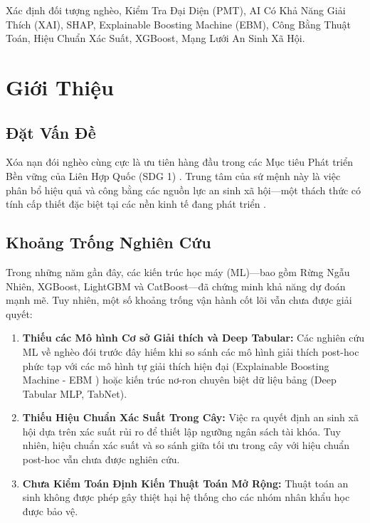 \documentclass[conference]{IEEEtran}
\begin{document}
\begin{IEEEkeywords}
Xác định đối tượng nghèo, Kiểm Tra Đại Diện (PMT), AI Có Khả Năng Giải Thích (XAI), SHAP, Explainable Boosting Machine (EBM), Công Bằng Thuật Toán, Hiệu Chuẩn Xác Suất, XGBoost, Mạng Lưới An Sinh Xã Hội.
\end{IEEEkeywords}

\section{Giới Thiệu}

\subsection{Đặt Vấn Đề}
Xóa nạn đói nghèo cùng cực là ưu tiên hàng đầu trong các Mục tiêu Phát triển Bền vững của Liên Hợp Quốc (SDG 1) \cite{b1}. Trung tâm của sứ mệnh này là việc phân bổ hiệu quả và công bằng các nguồn lực an sinh xã hội—một thách thức có tính cấp thiết đặc biệt tại các nền kinh tế đang phát triển \cite{b2, b3}.

\subsection{Khoảng Trống Nghiên Cứu}
Trong những năm gần đây, các kiến trúc học máy (ML)—bao gồm Rừng Ngẫu Nhiên, XGBoost, LightGBM và CatBoost—đã chứng minh khả năng dự đoán mạnh mẽ. Tuy nhiên, một số khoảng trống vận hành cốt lõi vẫn chưa được giải quyết:
\begin{enumerate}
\item \textbf{Thiếu các Mô hình Cơ sở Giải thích và Deep Tabular:} Các nghiên cứu ML về nghèo đói trước đây hiếm khi so sánh các mô hình giải thích post-hoc phức tạp với các mô hình tự giải thích hiện đại (Explainable Boosting Machine - EBM \cite{b25}) hoặc kiến trúc nơ-ron chuyên biệt dữ liệu bảng (Deep Tabular MLP, TabNet).
\item \textbf{Thiếu Hiệu Chuẩn Xác Suất Trong Cây:} Việc ra quyết định an sinh xã hội dựa trên xác suất rủi ro để thiết lập ngưỡng ngân sách tài khóa. Tuy nhiên, hiệu chuẩn xác suất và so sánh giữa tối ưu trong cây với hiệu chuẩn post-hoc vẫn chưa được nghiên cứu.
\item \textbf{Chưa Kiểm Toán Định Kiến Thuật Toán Mở Rộng:} Thuật toán an sinh không được phép gây thiệt hại hệ thống cho các nhóm nhân khẩu học được bảo vệ.
\end{enumerate}
\end{document}

